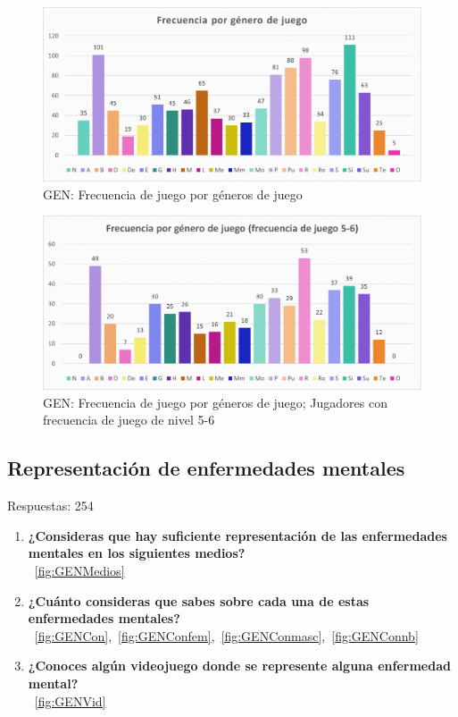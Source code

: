 \documentclass[12pt, a4paper,twoside,titlepage]{book}
\begin{document}
\begin{figure}
    \centering
    \includegraphics[width=1\linewidth]{ANEXO Gen/7AnexGENFrecgen}
    \caption{GEN: Frecuencia de juego por géneros de juego}
    \label{fig:GENFrecgen}
\end{figure}


\begin{figure}
    \centering
    \includegraphics[width=1\linewidth]{ANEXO Gen/8AnexGENFrecgen56}
    \caption{GEN: Frecuencia de juego por géneros de juego; Jugadores con frecuencia de juego de nivel 5-6}
\end{figure}



\subsection{Representación de enfermedades mentales}
Respuestas: 254
\begin{enumerate}[label=\textbf{\arabic*}.]
     \item \textbf{¿Consideras que hay suficiente representación de las enfermedades mentales en los siguientes medios?} \\
    ~\ref{fig:GENMedios}
     \item \textbf{¿Cuánto consideras que sabes sobre cada una de estas enfermedades mentales? }\\
    ~\ref{fig:GENCon},~\ref{fig:GENConfem},~\ref{fig:GENConmasc},~\ref{fig:GENConnb}
     \item \textbf{¿Conoces algún videojuego donde se represente alguna enfermedad mental? }\\
    ~\ref{fig:GENVid}
\end{enumerate}
\end{document}
